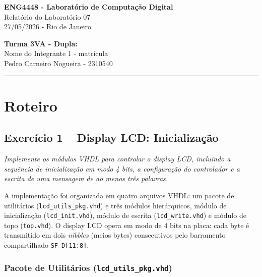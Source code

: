 \documentclass[12pt,a4paper]{article}
\newcommand{\question}[1]{
    \vspace{0.8em}
    \noindent\textit{#1}
    \vspace{0.4em}
}
\newcommand{\answer}{
    \par
}
\begin{document}
\begin{center}
    {\LARGE \textbf{ENG4448 - Laboratório de Computação Digital}}\\[0.3cm]
    {\Large Relatório do Laboratório 07}\\[0.2cm]
    27/05/2026 - Rio de Janeiro
\end{center}

\vspace{0.8cm}

\noindent \textbf{Turma 3VA - Dupla:}\\
Nome do Integrante 1 - matrícula\\
Pedro Carneiro Nogueira - 2310540

\vspace{0.5cm}
\hrule
\vspace{0.8cm}

\setcounter{section}{1}
\setcounter{subsection}{0}

\section{Roteiro}

\subsection{Exercício 1 – Display LCD: Inicialização}

\question{Implemente os módulos VHDL para controlar o display LCD, incluindo a sequência
de inicialização em modo 4 bits, a configuração do controlador e a escrita de uma mensagem
de ao menos três palavras.}

\answer
A implementação foi organizada em quatro arquivos VHDL: um pacote de utilitários
(\texttt{lcd\_utils\_pkg.vhd}) e três módulos hierárquicos, módulo de inicialização
(\texttt{lcd\_init.vhd}), módulo de escrita (\texttt{lcd\_write.vhd}) e módulo de topo
(\texttt{top.vhd}). O display LCD opera em modo de 4 bits na placa: cada byte é transmitido em dois \textit{nibbles} (meios bytes)
consecutivos pelo barramento compartilhado \texttt{SF\_D[11:8]}.

\subsubsection{Pacote de Utilitários (\texttt{lcd\_utils\_pkg.vhd})}
\end{document}
